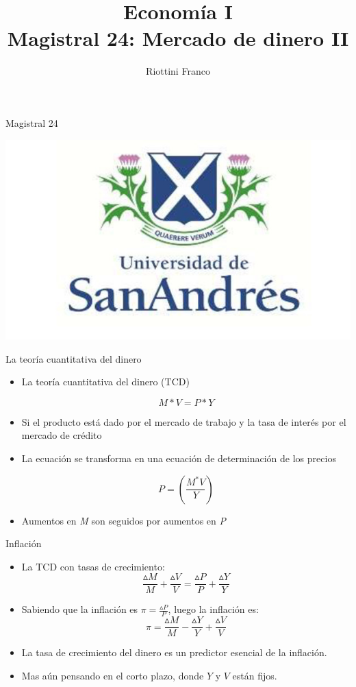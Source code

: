 \documentclass{beamer}
\title[Economía I]{Economía I \vspace{4mm}
\\ Magistral 24: Mercado de dinero II}
\date{}
\author[Riottini]{Riottini Franco}
\institute[]{Universidad de San Andrés}
\begin{document}
\begin{frame}
\titlepage
\centering
Magistral 24

\includegraphics[scale=0.2]{../Figures/logoUDESA.jpg} 
\end{frame}



\begin{frame}{La teoría cuantitativa del dinero}
    \begin{itemize}
        \item La teoría cuantitativa del dinero (TCD)
            
        $$M*V=P*Y$$

        \item Si el producto está dado por el mercado de trabajo y la tasa de interés por el mercado de crédito
        \item La ecuación se transforma en una ecuación de determinación de los precios
        
        $$P=\left(\frac{M^{*} V}{Y}\right)$$

        \item Aumentos en \textit{M} son seguidos por aumentos en \textit{P}
    \end{itemize}
        
\end{frame}

\begin{frame}{Inflación}
    \begin{itemize}
    \item La TCD con tasas de crecimiento:
        $$\frac{\vartriangle M}{M} + \frac{\vartriangle V}{V} = \frac{\vartriangle P}{P} + \frac{\vartriangle Y}{Y}$$
    \item Sabiendo que la inflación es $\pi = \frac{\vartriangle P}{P}$, luego la inflación es:
        $$\pi = \frac{\vartriangle M}{M} - \frac{\vartriangle Y}{Y} + \frac{\vartriangle V}{V}$$
    \item La tasa de crecimiento del dinero es un predictor esencial de la inflación.
    \item Mas aún pensando en el corto plazo, donde $Y$ y $V$ están fijos.
    \end{itemize}
\end{frame}
\end{document}
